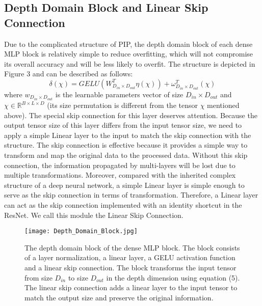 \documentclass[runningheads]{llncs}
\begin{document}
\subsection{Depth Domain Block and Linear Skip Connection}
Due to the complicated structure of PIP, the depth domain block of each dense MLP block is relatively simple to reduce overfitting, which will not compromise its overall accuracy and will be less likely to overfit. The structure is depicted in Figure 3 and can be described as follows:
\begin{equation}\label{eq4}
\delta(\chi)=GELU(W_{D_{in}\times D_{out}}^{T}\eta(\chi))+ \omega_{D_{in} \times D_{out}}^{T}(\chi)
\end{equation}
where $w_{D_{in}\times D_{out}}$ is the learnable parameters vector of size $D_{in}\times D_{out}$ and  $\chi\in\mathbb{R}^{B\times L \times D} $ (its size permutation is different from the tensor $\chi$ mentioned above). The special skip connection for this layer deserves attention. Because the output tensor size of this layer differs from the input tensor size, we need to apply a simple Linear layer to the input to match the skip connection with the structure. The skip connection is effective because it provides a simple way to transform and map the original data to the processed data. Without this skip connection, the information propagated by multi-layers will be lost due to multiple transformations.
Moreover, compared with the inherited complex structure of a deep neural network, a simple Linear layer is simple enough to serve as the skip connection in terms of transformation. Therefore, a Linear layer can act as the skip connection implemented with an identity shortcut in the ResNet. We call this module the Linear Skip Connection.

\begin{figure}
\centering
\texttt{[image: Depth\_Domain\_Block.jpg]}
\caption{The depth domain block of the dense MLP block. The block consists of a layer normalization, a linear layer, a GELU activation function and a linear skip connection. The block transforms the input tensor from size $D_{in}$ to size $D_{out}$ in the depth dimension using equation (5). The linear skip connection adds a linear layer to the input tensor to match the output size and preserve the original information. } \label{fig3}
\end{figure}
\end{document}
